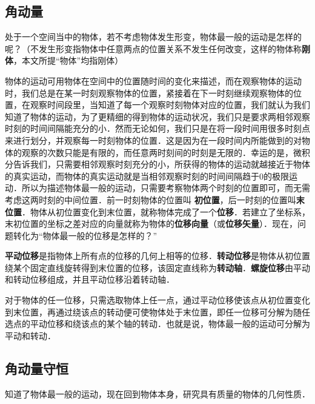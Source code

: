 
\begin{issues}
\issueTODO
\end{issues}
\subsection{角动量}
处于一个空间当中的物体，若不考虑物体发生形变，物体最一般的运动是怎样的呢？（不发生形变指物体中任意两点的位置关系不发生任何改变，这样的物体称\textbf{刚体}，本文所提“物体”均指刚体）

物体的运动可用物体在空间中的位置随时间的变化来描述，而在观察物体的运动时，我们总是在某一时刻观察物体的位置，紧接着在下一时刻继续观察物体的位置，在观察时间段里，当知道了每一个观察时刻物体对应的位置，我们就认为我们知道了物体的运动，为了更精细的得到物体的运动状况，我们只是要求两相邻观察时刻的时间间隔能充分的小．然而无论如何，我们只是在将一段时间用很多时刻点来进行划分，并观察每一时刻物体的位置．这是因为在一段时间内所能做到的对物体的观察的次数只能是有限的，而任意两时刻间的时刻是无限的．幸运的是，微积分告诉我们，只需要相邻观察时刻充分的小，所获得的物体的运动就越接近于物体的真实运动，而物体的真实运动就是当相邻观察时刻的时间间隔趋于0的极限运动．所以为描述物体最一般的运动，只需要考察物体两个时刻的位置即可，而无需考虑这两时刻的中间位置．前一时刻物体的位置叫 \textbf{初位置}，后一时刻的位置叫\textbf{末位置}．物体从初位置变化到末位置，就称物体完成了一个\textbf{位移}．若建立了坐标系，末初位置的坐标之差对应的向量就称为物体的\textbf{位移向量}（或\textbf{位移矢量}）．现在，问题转化为“物体最一般的位移是怎样的？”

\textbf{平动位移}是指物体上所有点的位移的几何上相等的位移．\textbf{转动位移}是物体从初位置绕某个固定直线旋转得到末位置的位移，该固定直线称为\textbf{转动轴}．\textbf{螺旋位移}由平动和转动位移组成，并且平动位移沿着转动轴．

对于物体的任一位移，只需选取物体上任一点，通过平动位移使该点从初位置变化到末位置，再通过绕该点的转动便可使物体处于末位置，即任一位移可分解为随任选点的平动位移和绕该点的某个轴的转动．也就是说，物体最一般的运动可分解为平动和转动．
\subsection{角动量守恒}
知道了物体最一般的运动，现在回到物体本身，研究具有质量的物体的几何性质．
